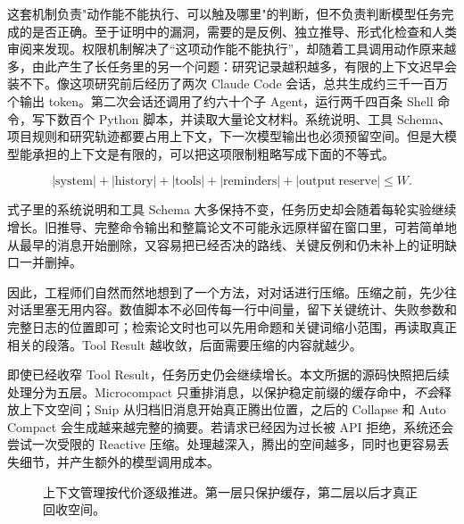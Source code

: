 这套机制负责"动作能不能执行、可以触及哪里"的判断，但不负责判断模型任务完成的是否正确。至于证明中的漏洞，需要的是反例、独立推导、形式化检查和人类审阅来发现。权限机制解决了“这项动作能不能执行”，却随着工具调用动作原来越多，由此产生了长任务里的另一个问题：研究记录越积越多，有限的上下文迟早会装不下。像这项研究前后经历了两次 Claude Code 会话，总共生成约三千一百万个输出 token。第二次会话还调用了约六十个子 Agent，运行两千四百条 Shell 命令，写下数百个 Python 脚本，并读取大量论文材料。系统说明、工具 Schema、项目规则和研究轨迹都要占用上下文，下一次模型输出也必须预留空间。但是大模型能承担的上下文是有限的，可以把这项限制粗略写成下面的不等式。\cite{ch03riemannweb}

\[
|\mathrm{system}|+|\mathrm{history}|+|\mathrm{tools}|+|\mathrm{reminders}|+|\mathrm{output\ reserve}|\leq W.
\]

式子里的系统说明和工具 Schema 大多保持不变，任务历史却会随着每轮实验继续增长。旧推导、完整命令输出和整篇论文不可能永远原样留在窗口里，可若简单地从最早的消息开始删除，又容易把已经否决的路线、关键反例和仍未补上的证明缺口一并删掉。\cite{ch03inside}

因此，工程师们自然而然地想到了一个方法，对对话进行压缩。压缩之前，先少往对话里塞无用内容。数值脚本不必回传每一行中间量，留下关键统计、失败参数和完整日志的位置即可；检索论文时也可以先用命题和关键词缩小范围，再读取真正相关的段落。Tool Result 越收敛，后面需要压缩的内容就越少。

即使已经收窄 Tool Result，任务历史仍会继续增长。本文所据的源码快照把后续处理分为五层。Microcompact 只重排消息，以保护稳定前缀的缓存命中，\emph{不会}释放上下文空间；Snip 从归档旧消息开始真正腾出位置，之后的 Collapse 和 Auto Compact 会生成越来越完整的摘要。若请求已经因为过长被 API 拒绝，系统还会尝试一次受限的 Reactive 压缩。处理越深入，腾出的空间越多，同时也更容易丢失细节，并产生额外的模型调用成本。\cite{ch03inside}

\begin{figure}[htbp]
\centering
{}
\caption{上下文管理按代价逐级推进。第一层只保护缓存，第二层以后才真正回收空间。}
\label{fig:ch03-compaction}
\end{figure}

